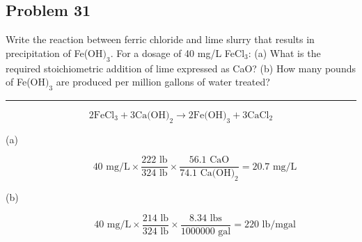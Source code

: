 \subsection*{Problem 31}
Write the reaction between ferric chloride and lime slurry that results in precipitation of Fe(O\(\text{H)}_3\). For a dosage of 40 mg/L Fe\(\text{Cl}_3\): (a) What is the required stoichiometric addition of lime expressed as CaO? (b) How many pounds of Fe(O\(\text{H)}_3\) are produced per million gallons of water treated?
\\\rule{5cm}{1pt}
\[2\text{FeCl}_3+3\text{Ca(OH)}_2\rightarrow2\text{Fe(OH)}_3+3\text{CaCl}_2\]
\begin{description}
    \item[(a)]
    \[\text{40 mg/L}\times\frac{\text{222 lb}}{\text{324 lb}}\times\frac{\text{56.1 CaO}}{\text{74.1 Ca(OH)}_2}=\boxed{\text{20.7 mg/L}}\]
    \item[(b)]
    \[\text{40 mg/L}\times\frac{\text{214 lb}}{\text{324 lb}}\times\frac{8.34\text{ lbs}}{1000000 \text{ gal}}=\boxed{\text{220 lb/mgal}}\]
\end{description}
